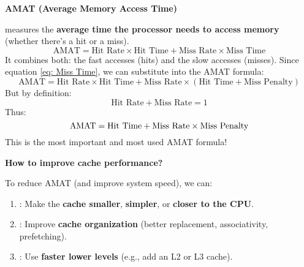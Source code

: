 \highspace
\begin{flushleft}
    \textcolor{Green3}{ \textbf{AMAT (Average Memory Access Time)}}
\end{flushleft}
 measures the \textbf{average time the processor needs to access memory} (whether there's a hit or a miss).
\begin{equation*}
    \text{AMAT} = \text{Hit Rate} \times \text{Hit Time} + \text{Miss Rate} \times \text{Miss Time}
\end{equation*}
It combines both: the fast accesses (hits) and the slow accesses (misses). Since equation \ref{eq: Miss Time}, we can substitute into the AMAT formula:
\begin{equation*}
    \text{AMAT} = \text{Hit Rate} \times \text{Hit Time} + \text{Miss Rate} \times (\text{Hit Time} + \text{Miss Penalty})
\end{equation*}
But by definition:
\begin{equation*}
    \text{Hit Rate} + \text{Miss Rate} = 1
\end{equation*}
Thus:
\begin{equation}\index{Formula Memory Hierarchy: AMAT}
    \text{AMAT} = \text{Hit Time} + \text{Miss Rate} \times \text{Miss Penalty}
\end{equation}
This is the most important and most used AMAT formula!

\highspace
\begin{flushleft}
    \textcolor{Green3}{\faIcon{\speedIcon} \textbf{How to improve cache performance?}}
\end{flushleft}
To reduce AMAT (and improve system speed), we can:
\begin{enumerate}
    \item {}: Make the \textbf{cache smaller}, \textbf{simpler}, or \textbf{closer to the CPU}.

    \item {}: Improve \textbf{cache organization} (better replacement, associativity, prefetching).

    \item {}: Use \textbf{faster lower levels} (e.g., add an L2 or L3 cache).
\end{enumerate}

